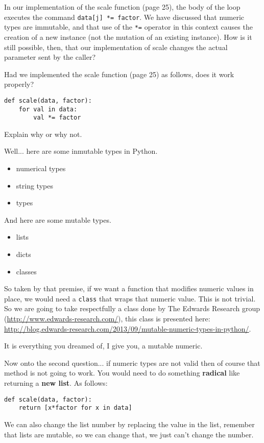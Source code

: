  \label{sssec:ex1_161_17}

In our implementation of the scale function (page 25), the body of the loop executes the command \texttt{data[j] *= factor}. We have discussed that numeric types are immutable, and that use of the \texttt{*=} operator in this context causes the creation of a new instance (not the mutation of an existing instance).
How is it still possible, then, that our implementation of scale changes the actual parameter sent by the caller?

Had we implemented the scale function (page 25) as follows, does it work properly?

\begin{lstlisting}[title=The incorrect\_way]
def scale(data, factor):
	for val in data:
		val *= factor
\end{lstlisting}

Explain why or why not.

Well... here are some inmutable types in Python.

\begin{itemize}
	\item numerical types
	\item string types
	\item types
\end{itemize}

And here are some mutable types.

\begin{itemize}
	\item lists
	\item dicts
	\item classes
\end{itemize}

So taken by that premise, if we want a function that modifies numeric values in place, we would need a \texttt{class} that wraps that numeric value. This is not trivial. So we are going to take respectfully a class done by The Edwards Research group (\url{http://www.edwards-research.com/}), this class is presented here: \url{http://blog.edwards-research.com/2013/09/mutable-numeric-types-in-python/}.

It is everything you dreamed of, I give you, a mutable numeric. 



Now onto the second question... if numeric types are not valid then of course that method is not going to work. You would need to do something \textbf{radical} like returning a \textbf{new list}. As follows:

\begin{lstlisting}[title=Returning new\_list]
def scale(data, factor):
    return [x*factor for x in data]
\end{lstlisting}

We can also change the list number by replacing the value in the list, remember that lists are mutable, so we can change that, we just can't change the number.



